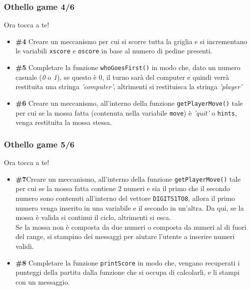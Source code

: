 \documentclass{beamer}
\begin{document}
\begin{frame}[fragile]
\frametitle{Othello game 4/6}
\begin{block}{Ora tocca a te!}
	\begin{itemize}
		\item \textbf{\#4} Creare un meccanismo per cui si scorre tutta la griglia e si incrementano le variabili \texttt{xscore} e \texttt{oscore} in base al numero di pedine presenti.
		\item \textbf{\#5} Completare la funzione \texttt{whoGoesFirst()} in modo che, dato un numero casuale (\textit{0} o \textit{1}), se questo è 0, il turno sarà del computer e quindi verrà restituita una stringa \textit{'computer'}, altrimenti si restituisca la stringa \textit{'player'}
		\item \textbf{\#6} Creare un meccanismo, all'interno della funzione \texttt{getPlayerMove()} tale per cui se la mossa fatta (contenuta nella variabile \texttt{move}) è \textit{'quit'} o \texttt{hints}, venga restituita la mossa stessa.
	\end{itemize}
\end{block}
\end{frame}

\begin{frame}[fragile]
\frametitle{Othello game 5/6}
\begin{block}{Ora tocca a te!}
	\begin{itemize}
		\item \textbf{\#7}Creare un meccanismo, all'interno della funzione \texttt{getPlayerMove()} tale per cui se la mossa fatta contiene 2 numeri e sia il primo che il secondo numero sono contenuti all'interno del vettore \texttt{DIGITS1TO8}, allora il primo numero venga inserito in una variabile e il secondo in un'altra. Da qui, se la mossa è valida si continui il ciclo, altrimenti si esca.\\
		Se la mossa non è composta da due numeri o composta da numeri al di fuori del range, si stampino dei messaggi per aiutare l'utente a inserire numeri validi.
		\item \textbf{\#8} Completare la funzione \texttt{printScore} in modo che, vengano recuperati i punteggi della partita dalla funzione che si occupa di calcolarli, e li stampi con un messaggio.
	\end{itemize}
\end{block}
\end{frame}
\end{document}

